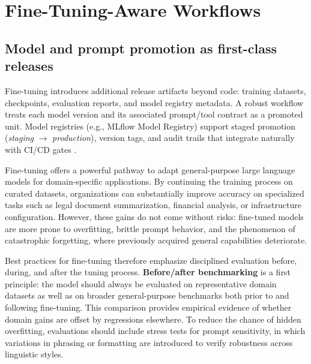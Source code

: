 
\section{Fine-Tuning-Aware Workflows}
\label{sec:cicd-finetune}
\subsection{Model and prompt promotion as first-class releases}
Fine-tuning introduces additional release artifacts beyond code: training datasets, checkpoints, evaluation reports, and model registry metadata. A robust workflow treats each model version and its associated prompt/tool contract as a promoted unit. Model registries (e.g., MLflow Model Registry) support staged promotion (\emph{staging} $\rightarrow$ \emph{production}), version tags, and audit trails that integrate naturally with CI/CD gates \cite{mlflow_model_registry,mlflow_model_registry_workflow}.

Fine-tuning offers a powerful pathway to adapt general-purpose large language models for domain-specific applications. By continuing the training process on curated datasets, organizations can substantially improve accuracy on specialized tasks such as legal document summarization, financial analysis, or infrastructure configuration. However, these gains do not come without risks: fine-tuned models are more prone to overfitting, brittle prompt behavior, and the phenomenon of catastrophic forgetting, where previously acquired general capabilities deteriorate.

Best practices for fine-tuning therefore emphasize disciplined evaluation before, during, and after the tuning process. \textbf{Before/after benchmarking} is a first principle: the model should always be evaluated on representative domain datasets as well as on broader general-purpose benchmarks both prior to and following fine-tuning. This comparison provides empirical evidence of whether domain gains are offset by regressions elsewhere. To reduce the chance of hidden overfitting, evaluations should include stress tests for prompt sensitivity, in which variations in phrasing or formatting are introduced to verify robustness across linguistic styles.

